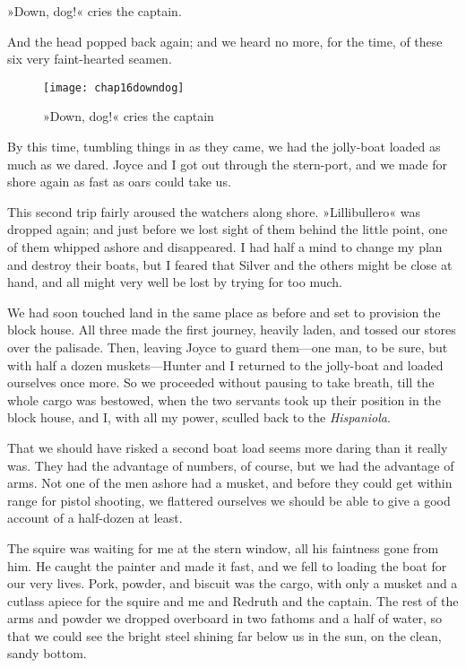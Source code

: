 »Down, dog!« cries the captain.

And the head popped back again; and we heard no more, for the time, of these six very faint-hearted seamen.

  \begin{figure}[p]
\centering
\texttt{[image: chap16downdog]}
\caption{»Down, dog!« cries the captain}
\end{figure} 

By this time, tumbling things in as they came, we had the jolly-boat loaded as much as we dared. Joyce and I got out through the stern-port, and we made for shore again as fast as oars could take us.

This second trip fairly aroused the watchers along shore. »Lillibullero« was dropped again; and just before we lost sight of them behind the little point, one of them whipped ashore and disappeared. I had half a mind to change my plan and destroy their boats, but I feared that Silver and the others might be close at hand, and all might very well be lost by trying for too much.

We had soon touched land in the same place as before and set to provision the block house. All three made the first journey, heavily laden, and tossed our stores over the palisade. Then, leaving Joyce to guard them—one man, to be sure, but with half a dozen muskets—Hunter and I returned to the jolly-boat and loaded ourselves once more. So we proceeded without pausing to take breath, till the whole cargo was bestowed, when the two servants took up their position in the block house, and I, with all my power, sculled back to the \textit{Hispaniola}.

That we should have risked a second boat load seems more daring than it really was. They had the advantage of numbers, of course, but we had the advantage of arms. Not one of the men ashore had a musket, and before they could get within range for pistol shooting, we flattered ourselves we should be able to give a good account of a half-dozen at least.

The squire was waiting for me at the stern window, all his faintness gone from him. He caught the painter and made it fast, and we fell to loading the boat for our very lives. Pork, powder, and biscuit was the cargo, with only a musket and a cutlass apiece for the squire and me and Redruth and the captain. The rest of the arms and powder we dropped overboard in two fathoms and a half of water, so that we could see the bright steel shining far below us in the sun, on the clean, sandy bottom.


